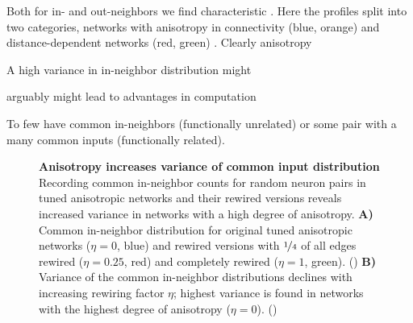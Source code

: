 Both for in- and out-neighbors we find characteristic . Here the
profiles split into two categories, networks with anisotropy in
connectivity (blue, orange) and distance-dependent networks (red,
green) . Clearly anisotropy



A high variance in in-neighbor distribution might 

arguably might lead to advantages in computation

To few have common in-neighbors (functionally unrelated) or some pair
with a many common inputs (functionally related). 



\begin{figure}[H]
  \centering
  \captionsetup{skip=7pt}
  \caption{\textbf{Anisotropy increases variance of common input
      distribution} Recording common in-neighbor counts for random
    neuron pairs in tuned anisotropic networks and their rewired
    versions reveals increased variance in networks with a high degree
    of anisotropy. \textbf{A)} Common in-neighbor distribution for
    original tuned anisotropic networks ($\eta = 0$, blue) and rewired
    versions with $\nicefrac{1}{4}$ of all edges rewired ($\eta =
    0.25$, red) and completely rewired ($\eta =1 $, green).
    () \textbf{B)} Variance of the common
    in-neighbor distributions declines with increasing rewiring factor
    $\eta$; highest variance is found in networks with the highest
    degree of anisotropy ($\eta = 0$). ()}
  \label{fig:cm_rule}
\end{figure}






